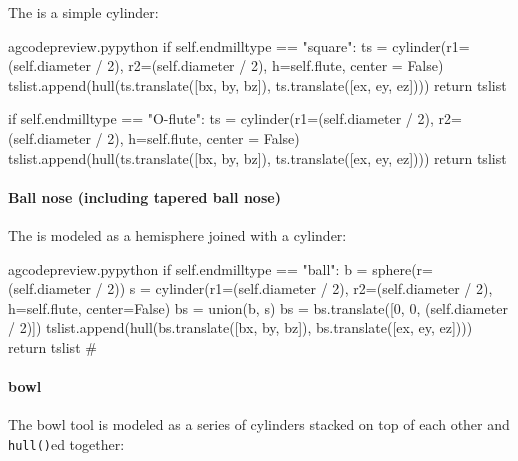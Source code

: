 \documentclass{ltxdoc}
\begin{document}
The  is a simple cylinder:

\lstset{firstnumber=\thegcpy}
\begin{writecode}{a}{gcodepreview.py}{python}
        if self.endmilltype == "square":
            ts = cylinder(r1=(self.diameter / 2), r2=(self.diameter / 2), h=self.flute, center = False)
            tslist.append(hull(ts.translate([bx, by, bz]), ts.translate([ex, ey, ez])))
            return tslist

        if self.endmilltype == "O-flute":
            ts = cylinder(r1=(self.diameter / 2), r2=(self.diameter / 2), h=self.flute, center = False)
            tslist.append(hull(ts.translate([bx, by, bz]), ts.translate([ex, ey, ez])))
            return tslist

\end{writecode}
\addtocounter{gcpy}{10}

\paragraph{Ball nose (including tapered ball nose)}

The  is modeled as a hemisphere joined with a cylinder:

\lstset{firstnumber=\thegcpy}
\begin{writecode}{a}{gcodepreview.py}{python}
        if self.endmilltype == "ball":
            b = sphere(r=(self.diameter / 2))
            s = cylinder(r1=(self.diameter / 2), r2=(self.diameter / 2), h=self.flute, center=False)
            bs = union(b, s)
            bs = bs.translate([0, 0, (self.diameter / 2)])
            tslist.append(hull(bs.translate([bx, by, bz]), bs.translate([ex, ey, ez])))
            return tslist
#
\end{writecode}
\addtocounter{gcpy}{8}

\paragraph{bowl} 

The bowl tool is modeled as a series of cylinders stacked on top of each other and \verb|hull()|ed together:
\end{document}
